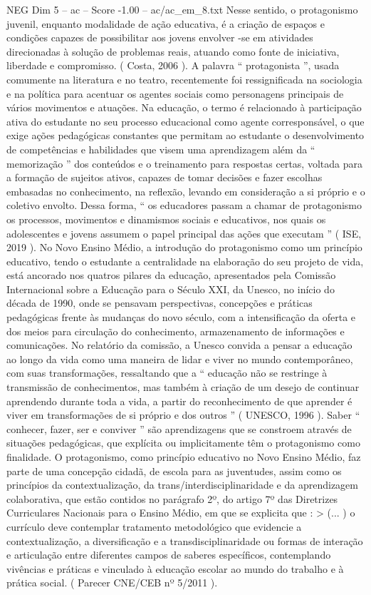 \begin{textsample}{NEG Dim 5 – ac – Score -1.00 – ac/ac\_em\_8.txt}
Nesse sentido, o protagonismo juvenil, enquanto modalidade de ação educativa, é a criação de espaços e condições capazes de possibilitar aos jovens envolver -se em atividades direcionadas à solução de problemas reais, atuando como fonte de iniciativa, liberdade e compromisso. ( Costa, 2006 ).
A palavra “ protagonista ”, usada comumente na literatura e no teatro, recentemente foi ressignificada na sociologia e na política para acentuar os agentes sociais como personagens principais de vários movimentos e atuações.
Na educação, o termo é relacionado à participação ativa do estudante no seu processo educacional como agente corresponsável, o que exige ações pedagógicas constantes que permitam ao estudante o desenvolvimento de competências e habilidades que visem uma aprendizagem além da “ memorização ” dos conteúdos e o treinamento para respostas certas, voltada para a formação de sujeitos ativos, capazes de tomar decisões e fazer escolhas embasadas no conhecimento, na reflexão, levando em consideração a si próprio e o coletivo envolto.
Dessa forma, “ os educadores passam a chamar de protagonismo os processos, movimentos e dinamismos sociais e educativos, nos quais os adolescentes e jovens assumem o papel principal das ações que executam ” ( ISE, 2019 ).
No Novo Ensino Médio, a introdução do protagonismo como um princípio educativo, tendo o estudante a centralidade na elaboração do seu projeto de vida, está ancorado nos quatros pilares da educação, apresentados pela Comissão Internacional sobre a Educação para o Século XXI, da Unesco, no início do década de 1990, onde se pensavam perspectivas, concepções e práticas pedagógicas frente às mudanças do novo século, com a intensificação da oferta e dos meios para circulação do conhecimento, armazenamento de informações e comunicações.
No relatório da comissão, a Unesco convida a pensar a educação ao longo da vida como uma maneira de lidar e viver no mundo contemporâneo, com suas transformações, ressaltando que a “ educação não se restringe à transmissão de conhecimentos, mas também à criação de um desejo de continuar aprendendo durante toda a vida, a partir do reconhecimento de que aprender é viver em transformações de si próprio e dos outros ” ( UNESCO, 1996 ).
Saber “ conhecer, fazer, ser e conviver ” são aprendizagens que se constroem através de situações pedagógicas, que explícita ou implicitamente têm o protagonismo como finalidade.
O protagonismo, como princípio educativo no Novo Ensino Médio, faz parte de uma concepção cidadã, de escola para as juventudes, assim como os princípios da contextualização, da trans/interdisciplinaridade e da aprendizagem colaborativa, que estão contidos no parágrafo 2º, do artigo 7º das Diretrizes Curriculares Nacionais para o Ensino Médio, em que se explicita que : > (... ) o currículo deve contemplar tratamento metodológico que evidencie a contextualização, a diversificação e a transdisciplinaridade ou formas de interação e articulação entre diferentes campos de saberes específicos, contemplando vivências e práticas e vinculado à educação escolar ao mundo do trabalho e à prática social. ( Parecer CNE/CEB nº 5/2011 ).

\end{textsample}

